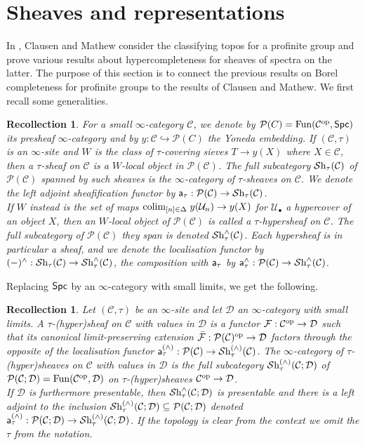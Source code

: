 \documentclass[reqno]{amsart}
\numberwithin{equation}{section}\theoremstyle{thms}
\theoremstyle{defn}
\newtheorem{rec}[equation]{Recollection}
\newcommand{\cC}{\mathcal{C}}
\newcommand{\cD}{\mathcal{D}}
\newcommand{\cF}{\mathcal{F}}
\newcommand{\cP}{\mathcal{P}}
\newcommand{\cU}{\mathcal{U}}
\newcommand{\tn}[1]{\textnormal{#1}}
\newcommand{\tsf}[1]{\textsf{\textup{#1}}}
\newcommand{\mcal}[1]{\mathcal{#1}}
\newcommand{\op}{\tn{op}}
\newcommand{\fun}{\tn{Fun}}
\newcommand{\sheaves}{\mcal{S}\tn{h}}
\newcommand{\spc}{\tsf{Spc}}
\begin{document}
\section{Sheaves and representations}\label{sec:sheavesandreps}

In \cite[§4.1]{cm21}, Clausen and Mathew consider the classifying topos for a profinite group and prove various results about hypercompleteness for sheaves of spectra on the latter. The purpose of this section is to connect the previous results on Borel completeness for profinite groups to the results of Clausen and Mathew. We first recall some generalities.

\begin{rec}
For a small $\infty$-category $\cC$, we denote by $\cP(C) = \fun(\cC^{\op},\spc)$ its \emph{presheaf $\infty$-category} and by $y: \cC \hookrightarrow \cP(C)$ the Yoneda embedding. If $(\cC, \tau)$ is an $\infty$-site and $W$ is the class of $\tau$-covering sieves $T \to y(X)$ where $X \in \cC$, then a \emph{$\tau$-sheaf on $\cC$} is a $W$-local object in $\cP(\cC)$. The full subcategory $\sheaves_{\tau}(\cC)$ of $\cP(\cC)$ spanned by such sheaves is the \emph{$\infty$-category of $\tau$-sheaves on $\cC$}. We denote the left adjoint sheafification functor by $\tsf{a}_{\tau}: \cP(\cC) \to \sheaves_{\tau}(\cC)$. \\
If $W$ instead is the set of maps $\tn{colim}_{[n] \in \Delta} \; y(\cU_n) \to y(X)$ for $\cU_{\bullet}$ a hypercover of an object $X$, then an $W$-local object of $\cP(\cC)$ is called a \emph{$\tau$-hypersheaf on $\cC$}. The full subcategory of $\cP(\cC)$ they span is denoted $\sheaves^{\wedge}_{\tau}(\cC)$. Each hypersheaf is in particular a sheaf, and we denote the localisation functor by $(-)^{\wedge}: \sheaves_{\tau}(\cC) \to \sheaves^{\wedge}_{\tau}(\cC)$, the composition with $\tsf{a}_{\tau}$ by $\tsf{a}_{\tau}^{\wedge}: \cP(\cC) \to \sheaves_{\tau}^{\wedge}(\cC)$.
\end{rec}

Replacing $\spc$ by an $\infty$-category with small limits, we get the following.

\begin{rec}
Let $(\cC, \tau)$ be an $\infty$-site and let $\cD$ an $\infty$-category with small limits. A \emph{$\tau$-(hyper)sheaf} on $\cC$ with values in $\cD$ is a functor $\cF: \cC^{\op} \to \cD$ such that its canonical limit-preserving extension $\bar{\cF}: \cP(\cC)^{\op} \to \cD$ factors through the opposite of the localisation functor $\tsf{a}^{(\wedge)}_{\tau}: \cP(\cC) \to \sheaves^{(\wedge)}_{\tau}(\cC)$. The \emph{$\infty$-category of $\tau$-(hyper)sheaves on $\cC$ with values in $\cD$} is the full subcategory $\sheaves_{\tau}^{(\wedge)}(\cC; \cD)$ of $\cP(\cC;\cD)=\fun(\cC^{\op},\cD)$ on $\tau$-(hyper)sheaves $\cC^{\op} \to \cD$. \\
If $\cD$ is furthermore presentable, then $\sheaves_{\tau}^{\wedge}(\cC; \cD)$ is presentable and there is a left adjoint to the inclusion $\sheaves_{\tau}^{(\wedge)}(\cC; \cD) \subseteq \cP(\cC;\cD)$ denoted $\tsf{a}_{\tau}^{(\wedge)}: \cP(\cC;\cD) \to \sheaves_{\tau}^{(\wedge)}(\cC;\cD)$. If the topology is clear from the context we omit the $\tau$ from the notation.
\end{rec}
\end{document}
